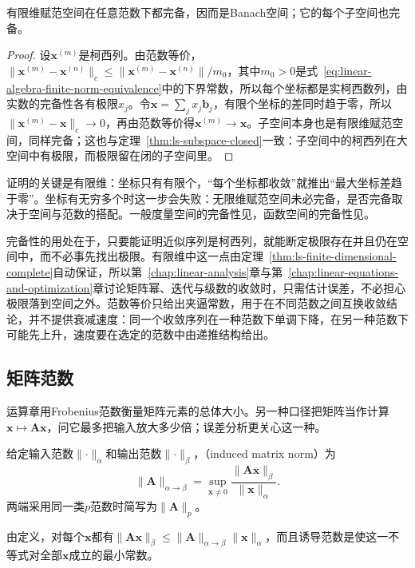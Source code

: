 \begin{theorem}[有限维赋范空间的完备性]
\label{thm:ls-finite-dimensional-complete}
有限维赋范空间在任意范数下都完备，因而是Banach空间；它的每个子空间也完备。
\end{theorem}
\begin{proof}
设$\bm x^{(m)}$是柯西列。由范数等价，$\lVert\bm x^{(m)}-\bm x^{(n)}\rVert_c\leq\lVert\bm x^{(m)}-\bm x^{(n)}\rVert/m_0$，其中$m_0>0$是式~\eqref{eq:linear-algebra-finite-norm-equivalence}中的下界常数，所以每个坐标都是实柯西数列，由实数的完备性各有极限$x_j$。令$\bm x=\sum_jx_j\bm b_j$，有限个坐标的差同时趋于零，所以$\lVert\bm x^{(m)}-\bm x\rVert_c\to0$，再由范数等价得$\bm x^{(m)}\to\bm x$。子空间本身也是有限维赋范空间，同样完备；这也与定理~\ref{thm:ls-subspace-closed}一致：子空间中的柯西列在大空间中有极限，而极限留在闭的子空间里。
\end{proof}
证明的关键是有限维：坐标只有有限个，“每个坐标都收敛”就推出“最大坐标差趋于零”。坐标有无穷多个时这一步会失败：无限维赋范空间未必完备，是否完备取决于空间与范数的搭配。一般度量空间的完备性见，函数空间的完备性见。

完备性的用处在于，只要能证明近似序列是柯西列，就能断定极限存在并且仍在空间中，而不必事先找出极限。有限维中这一点由定理~\ref{thm:ls-finite-dimensional-complete}自动保证，所以第~\ref{chap:linear-analysis}章与第~\ref{chap:linear-equations-and-optimization}章讨论矩阵幂、迭代与级数的收敛时，只需估计误差，不必担心极限落到空间之外。范数等价只给出夹逼常数，用于在不同范数之间互换收敛结论，并不提供衰减速度：同一个收敛序列在一种范数下单调下降，在另一种范数下可能先上升，速度要在选定的范数中由递推结构给出。

\subsection{矩阵范数}
\label{sec:ls-matrix-norms}
\label{sec:ch06-map-comparison}
\label{sec:matrix-analysis-norms-effective-rank}

运算章用Frobenius范数衡量矩阵元素的总体大小。另一种口径把矩阵当作计算$\bm x\mapsto\bm A\bm x$，问它最多把输入放大多少倍；误差分析更关心这一种。
\begin{definition}[由向量范数诱导的矩阵范数]
\label{def:matrix-analysis-induced-norm}
给定输入范数$\lVert\cdot\rVert_\alpha$和输出范数$\lVert\cdot\rVert_\beta$，（induced matrix norm）为
\[
 \lVert\bm A\rVert_{\alpha\to\beta}
 =\sup_{\bm x\neq0}\frac{\lVert\bm A\bm x\rVert_\beta}{\lVert\bm x\rVert_\alpha}.
\]
两端采用同一类$p$范数时简写为$\lVert\bm A\rVert_p$。
\end{definition}
由定义，对每个$\bm x$都有$\lVert\bm A\bm x\rVert_\beta\leq\lVert\bm A\rVert_{\alpha\to\beta}\lVert\bm x\rVert_\alpha$，而且诱导范数是使这一不等式对全部$\bm x$成立的最小常数。

